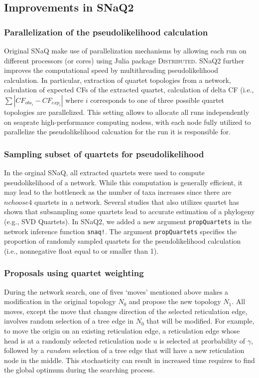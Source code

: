 \documentclass[unnumsec,webpdf,contemporary,large]{oup-authoring-template}%
\theoremstyle{thmstyleone}%
\theoremstyle{thmstyletwo}%
\theoremstyle{thmstylethree}%
\begin{document}
\subsection{Improvements in SNaQ2}\label{subsec2}
\subsubsection{Parallelization of the pseudolikelihood calculation}\label{subsubsec1}
Original SNaQ make use of parallelization mechanisms by allowing each run on different processors (or cores) using Julia package \textsc{Distributed}. SNaQ2 further improves the computational speed by multithreading pseudolikelihood calculation. In particular, extraction of quartet topologies from a network, calculation of expected CFs of the extracted quartet, calculation of delta CF (i.e., $\sum|CF_{obs_i}-CF_{exp_i}|$ where $i$ corresponds to one of three possible quartet topologies are parallelized. This setting allows to allocate all runs independently on seaprate high-performance computing nodess, with each node fully utilized to parallelize the pseudolikelihood calcuation for the run it is responsible for.

\subsubsection{Sampling subset of quartets for pseudolikelihood}\label{subsubsec3}
In the orginal SNaQ, all extracted quartets were used to compute pseudolikelihood of a network. While this computation is generally efficient, it may lead to the bottleneck as the number of taxa increases since there are $n choose 4$ quartets in a network. Several studies that also utilizes quartet has shown that subsampling some quartets lead to accurate estimation of a phylogeny (e.g., SVD Quartets). In SNaQ2, we added a new argument \texttt{propQuartets} in the network inference function \texttt{snaq!}. The argument \texttt{propQuartets} specifies the proportion of randomly sampled quartets for the pseudolikelihood calculation (i.e., nonnegative float equal to or smaller than 1). 

\subsubsection{Proposals using quartet weighting}\label{subsubsec2}
During the network search, one of fives `moves' mentioned above makes a modification in the original topology $N_0$ and propose the new topology $N_1$. All moves, except the move that changes direction of the selected reticulation edge, involves random selection of a tree edge in $N_0$ that will be modified. For example, to move the origin on an existing reticulation edge, a reticulation edge whose head is at a randomly selected reticulation node $u$ is selected at prorbability of $\gamma$, followed by a $random$ selection of a tree edge that will have a new reticulation node in the middle. This stochasticity can result in increased time requires to find the global optimum during the searching process.
\end{document}
